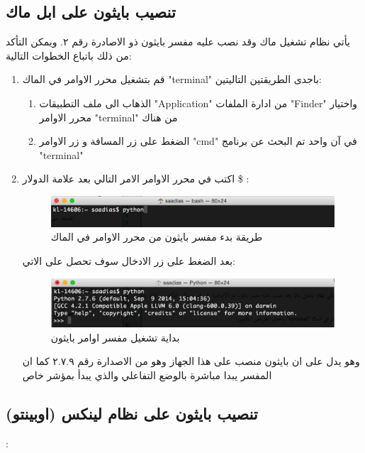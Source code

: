 \subsection{تنصيب بايثون على ابل ماك}
يأتي نظام تشغيل ماك وقد نصب عليه مفسر بايثون ذو الاصادرة رقم ٢. ويمكن التأكد من ذلك باتباع الخطوات التالية:
\begin{enumerate}
\item
قم بتشغيل محرر الاوامر في الماك "terminal" باجدى الطريقتين التاليتين:
\begin{enumerate}
\item
الذهاب الى ملف التطبيقات "Application" من ادارة الملفات "Finder" واختيار محرر الاوامر "terminal" من هناك
\item
الضغط على زر المسافة و زر الاوامر "cmd" في آن واحد تم البحث عن برنامج "terminal"
\end{enumerate}
\item
اكتب في محرر الاوامر الامر التالي بعد علامة الدولار \$ :
 
\begin{figure}[H]
  \includegraphics[width=\linewidth]{figures/startpython.png}
  \caption{طريقة بدء مفسر بايثون من محرر الاوامر في الماك}
  \label{fig:startpython}
\end{figure}
بعد الضغط على زر الادخال سوف تحصل على الاتي:

\begin{figure}[H]
  \includegraphics[width=\linewidth]{figures/startpython2.png}
  \caption{بداية تشغيل مفسر اوامر بايثون}
  \label{fig:startpython2}
\end{figure}

وهو يدل على ان بايثون منصب على هذا الجهاز وهو من الاصدارة رقم ٢.٧.٩  كما ان المفسر يبدا مباشرة بالوضع التفاعلي والذي يبدأ بمؤشر خاص 

\end{enumerate}
\subsection{تنصيب بايثون على نظام لينكس (اوبينتو)}
:

